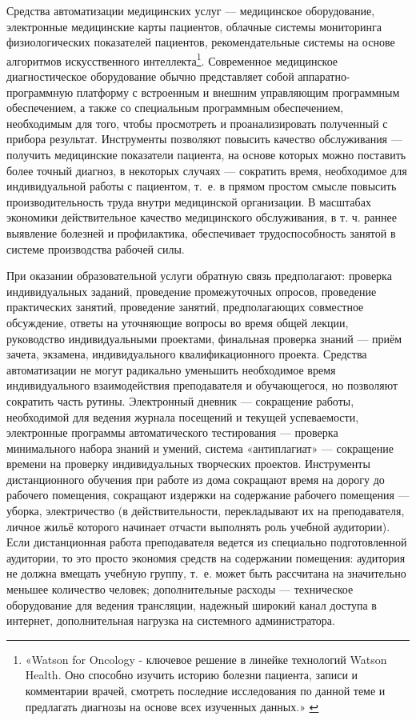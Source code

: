 \documentclass{article}
\begin{document}
Средства автоматизации медицинских услуг — медицинское оборудование, электронные медицинские карты пациентов, облачные системы мониторинга физиологических показателей пациентов, рекомендательные системы на основе алгоритмов искусственного интеллекта\footnote{«Watson for Oncology - ключевое решение в линейке технологий Watson Health. Оно способно изучить историю болезни пациента, записи и комментарии врачей, смотреть последние исследования по данной теме и предлагать диагнозы на основе всех изученных данных.» \cite{ibmWatson2022}}. Современное медицинское диагностическое оборудование обычно представляет собой аппаратно-программную платформу с встроенным и внешним управляющим программным обеспечением, а также со специальным программным обеспечением, необходимым для того, чтобы просмотреть и проанализировать полученный с прибора результат. Инструменты позволяют повысить качество обслуживания — получить медицинские показатели пациента, на основе которых можно поставить более точный диагноз, в некоторых случаях — сократить время, необходимое для индивидуальной работы с пациентом, т. е. в прямом простом смысле повысить производительность труда внутри медицинской организации. В масштабах экономики действительное качество медицинского обслуживания, в т. ч. раннее выявление болезней и профилактика, обеспечивает трудоспособность занятой в системе производства рабочей силы.

При оказании образовательной услуги обратную связь предполагают: проверка индивидуальных заданий, проведение промежуточных опросов, проведение практических занятий, проведение занятий, предполагающих совместное обсуждение, ответы на уточняющие вопросы во время общей лекции, руководство индивидуальными проектами, финальная проверка знаний — приём зачета, экзамена, индивидуального квалификационного проекта. Средства автоматизации не могут радикально уменьшить необходимое время индивидуального взаимодействия преподавателя и обучающегося, но позволяют сократить часть рутины. Электронный дневник — сокращение работы, необходимой для ведения журнала посещений и текущей успеваемости, электронные программы автоматического тестирования — проверка минимального набора знаний и умений, система «антиплагиат» — сокращение времени на проверку индивидуальных творческих проектов. Инструменты дистанционного обучения при работе из дома сокращают время на дорогу до рабочего помещения, сокращают издержки на содержание рабочего помещения — уборка, электричество (в действительности, перекладывают их на преподавателя, личное жильё которого начинает отчасти выполнять роль учебной аудитории). Если дистанционная работа преподавателя ведется из специально подготовленной аудитории, то это просто экономия средств на содержании помещения: аудитория не должна вмещать учебную группу, т. е. может быть рассчитана на значительно меньшее количество человек; дополнительные расходы — техническое оборудование для ведения трансляции, надежный широкий канал доступа в интернет, дополнительная  нагрузка на системного администратора.
\end{document}
